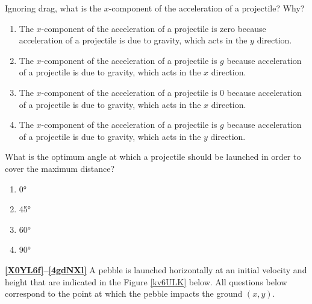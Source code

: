 \documentclass[main-physics.tex]{subfiles}
\begin{document}
\begin{exercise} \label{DnqDpu}
    Ignoring drag, what is the $x$-component of the acceleration of a projectile? Why?
\end{exercise}

\begin{enumerate}[label=\Alph*.]
    \item The $x$-component of the acceleration of a projectile is zero because acceleration of a projectile is due to gravity, which acts in the $y$ direction.
    \item The $x$-component of the acceleration of a projectile is $g$ because acceleration of a projectile is due to gravity, which acts in the $x$ direction.
    \item The $x$-component of the acceleration of a projectile is 0 because acceleration of a projectile is due to gravity, which acts in the $x$ direction.
    \item The $x$-component of the acceleration of a projectile is $g$ because acceleration of a projectile is due to gravity, which acts in the $y$ direction.
\end{enumerate}

\begin{exercise} \label{QsBUvP}
    What is the optimum angle at which a projectile should be launched in order to cover the maximum distance?
\end{exercise}

\begin{enumerate}[label=\Alph*.]
    \item \ang{0}
    \item \ang{45}
    \item \ang{60}
    \item \ang{90}
\end{enumerate}

\vspace{1em}

\cyanhrule

\vspace{1em}

\textbf{\ref{X0YL6f}--\ref{4gdNXl}} A pebble is launched horizontally at an initial velocity and height that are indicated in the Figure \ref{kv6ULK} below. All questions below correspond to the point at which the pebble impacts the ground $(x,y)$.
\end{document}
